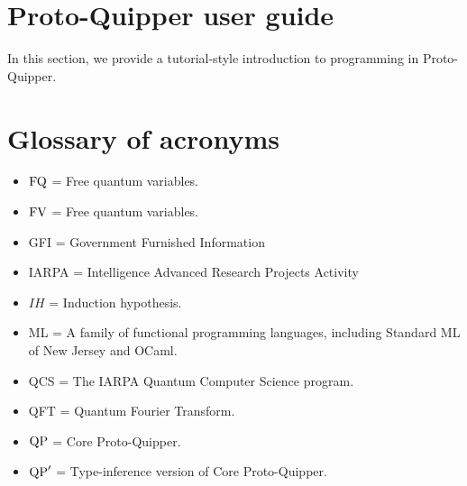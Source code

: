 \documentclass[twoside]{article}
\begin{document}
\clearpage
\section{Proto-Quipper user guide}
\label{sec-user-guide}

In this section, we provide a tutorial-style introduction to 
programming in Proto-Quipper. 



\clearpage
\section*{Glossary of acronyms}

\begin{itemize}
  \item $\mathop{\textrm{FQ}}\nolimits$ = Free quantum variables.
  \item $\mathop{\textrm{FV}}\nolimits$ = Free quantum variables.
  \item GFI = Government Furnished Information
  \item IARPA = Intelligence Advanced Research Projects Activity
  \item $IH$ = Induction hypothesis.
  \item ML = A family of functional programming languages, including
    Standard ML of New Jersey and OCaml.
  \item QCS = The IARPA Quantum Computer Science program.
  \item QFT = Quantum Fourier Transform.
  \item ${\rm QP}$ = Core Proto-Quipper.
  \item ${\rm QP}'$ = Type-inference version of Core Proto-Quipper.
\end{itemize}

\clearpage

{}

\end{document}
